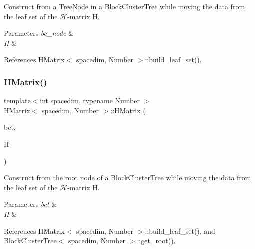 Construct from a {\ttfamily \hyperlink{classTreeNode}{Tree\+Node}} in a {\ttfamily \hyperlink{classBlockClusterTree}{Block\+Cluster\+Tree}} while moving the data from the leaf set of the $\mathcal{H}$-\/matrix {\ttfamily H}.


\begin{DoxyParams}{Parameters}
{\em bc\+\_\+node} & \\
\hline
{\em H} & \\
\hline
\end{DoxyParams}


References H\+Matrix$<$ spacedim, Number $>$\+::build\+\_\+leaf\+\_\+set().

\mbox{\label{classHMatrix_a78aa967d7a99e27cc172f0db3791306b}} 
\subsubsection{\texorpdfstring{H\+Matrix()}{HMatrix()}\hspace{0.1cm}{\footnotesize\ttfamily [7/9]}}
{\footnotesize\ttfamily template$<$int spacedim, typename Number $>$ \\
\hyperlink{classHMatrix}{H\+Matrix}$<$ spacedim, Number $>$\+::\hyperlink{classHMatrix}{H\+Matrix} (\begin{DoxyParamCaption}\item[{const \hyperlink{classBlockClusterTree}{Block\+Cluster\+Tree}$<$ spacedim, Number $>$ \&}]{bct,  }\item[{\hyperlink{classHMatrix}{H\+Matrix}$<$ spacedim, Number $>$ \&\&}]{H }\end{DoxyParamCaption})}

Construct from the root node of a \hyperlink{classBlockClusterTree}{Block\+Cluster\+Tree} while moving the data from the leaf set of the $\mathcal{H}$-\/matrix {\ttfamily H}.


\begin{DoxyParams}{Parameters}
{\em bct} & \\
\hline
{\em H} & \\
\hline
\end{DoxyParams}


References H\+Matrix$<$ spacedim, Number $>$\+::build\+\_\+leaf\+\_\+set(), and Block\+Cluster\+Tree$<$ spacedim, Number $>$\+::get\+\_\+root().

\mbox{\label{classHMatrix_a0b5227e35290f6c9fba1e8948e9a29c3}} 
